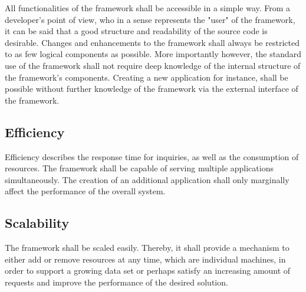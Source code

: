 All functionalities of the framework shall be accessible in a simple way. From a developer's point of view, who in a sense represents the "user" of the framework, it can be said that a good structure and readability of the source code is desirable. Changes and enhancements to the framework shall always be restricted to as few logical components as possible. More importantly however, the standard use of the framework shall not require deep knowledge of the internal structure of the framework's components. Creating a new application for instance, shall be possible without further knowledge of the framework via the external interface of the framework.


\subsection{Efficiency}
Efficiency describes the response time for inquiries, as well as the consumption of resources. The framework shall be capable of serving multiple applications simultaneously. The creation of an additional application shall only marginally affect the performance of the overall system.

\subsection{Scalability}
The framework shall be scaled easily. Thereby, it shall provide a mechanism to either add or remove resources at any time, which are individual machines, in order to support a growing data set or perhaps satisfy an increasing amount of requests and improve the performance of the desired solution.
